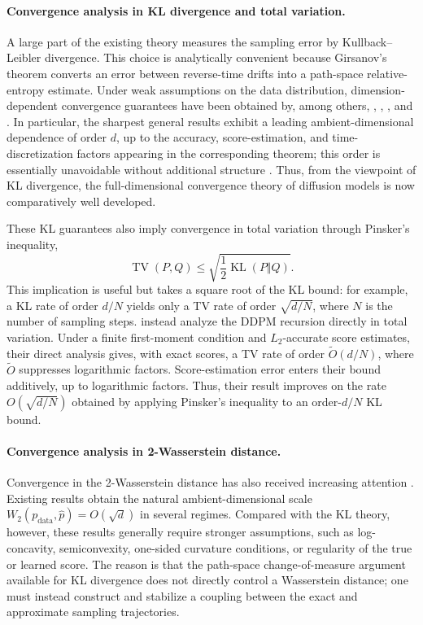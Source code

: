 \documentclass[11pt]{article}
\theoremstyle{definition}
\newcommand{\pdata}{p_{\mathrm{data}}}
\newcommand{\Wtwo}{W_2}
\newcommand{\KL}{\operatorname{KL}}
\newcommand{\TV}{\operatorname{TV}}
\begin{document}
\paragraph{Convergence analysis in KL divergence and total variation.}
A large part of the existing theory measures the sampling error by Kullback--Leibler divergence. 
This choice is analytically convenient because Girsanov's theorem converts 
an error between reverse-time drifts into a path-space relative-entropy estimate. 
Under weak assumptions on the data distribution, 
dimension-dependent convergence guarantees have been obtained by, among others, 
\citet{chen2023sampling}, \citet{chen2023improved}, \citet{benton2024nearly}, and \citet{koike2026follmer}. 
In particular, the sharpest general results exhibit a leading ambient-dimensional dependence of order $d$, up to the accuracy, score-estimation, and time-discretization factors appearing in the corresponding theorem; this order is essentially unavoidable without additional structure \citep{benton2024nearly}. Thus, from the viewpoint of KL divergence, the full-dimensional convergence theory of diffusion models is now comparatively well developed.

These KL guarantees also imply convergence in total variation through
Pinsker's inequality,
\[
    \TV(P,Q)
    \le
    \sqrt{\frac{1}{2}\KL(P\Vert Q)}.
\]
This implication is useful but takes a square root of the KL bound:
for example, a KL rate of order $d/N$ yields only a TV rate of order
$\sqrt{d/N}$, where $N$ is the number of sampling steps.
\citet[Theorem~1]{li2025od} instead analyze the DDPM recursion
directly in total variation. Under a finite first-moment condition and
$L_2$-accurate score estimates, their direct analysis gives, with
exact scores, a TV rate of order $\widetilde O(d/N)$, where
$\widetilde O$ suppresses logarithmic factors. Score-estimation error
enters their bound additively, up to logarithmic factors. Thus, their
result improves on the rate
$O(\sqrt{d/N})$ obtained by applying Pinsker's inequality to an
order-$d/N$ KL bound.

\paragraph{Convergence analysis in 2-Wasserstein distance.}
Convergence in the 2-Wasserstein distance has also received increasing attention \citep{gao2025wasserstein,bruno2025wasserstein,arsenyan2025assessing,gentiloni2025beyond,beyler2025convergence,yu2025advancing}. Existing results obtain the natural ambient-dimensional scale $\Wtwo(\pdata,\hat p)=O(\sqrt d)$ in several regimes. Compared with the KL theory, however, these results generally require stronger assumptions, such as log-concavity, semiconvexity, one-sided curvature conditions, or regularity of the true or learned score. The reason is that the path-space change-of-measure argument available for KL divergence does not directly control a Wasserstein distance; one must instead construct and stabilize a coupling between the exact and approximate sampling trajectories.
\end{document}
